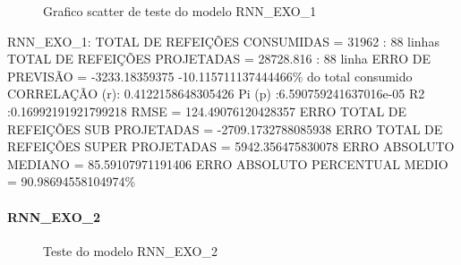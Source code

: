 \documentclass[	12pt, Times, openright, twoside, a4paper, english, brazil]{abntex2}
\begin{document}
                \begin{figure}[!ht]
                  \caption{Grafico scatter de teste do modelo RNN\_EXO\_1 \label{fig:case1_rnn_exo_1_test_scatter} }
                \end{figure}
                RNN\_EXO\_1:
                TOTAL DE REFEIÇÕES CONSUMIDAS = 31962 : 88 linhas \newline
                TOTAL DE REFEIÇÕES PROJETADAS = 28728.816 : 88 linha \newline
                ERRO DE PREVISÃO = -3233.18359375 -10.115711137444466\% do total consumido\newline
                CORRELAÇÃO (r): 0.4122158648305426 Pi (p) :6.590759241637016e-05 R2 :0.16992191921799218\newline
                RMSE = 124.49076120428357\newline
                ERRO TOTAL DE REFEIÇÕES SUB PROJETADAS = -2709.1732788085938\newline
                ERRO TOTAL DE REFEIÇÕES SUPER PROJETADAS = 5942.356475830078\newline
                ERRO ABSOLUTO MEDIANO = 85.59107971191406\newline
                ERRO ABSOLUTO PERCENTUAL MEDIO = 90.98694558104974\%\newline
              \paragraph{RNN\_EXO\_2}
                \begin{figure}[!ht]
                  \caption{Teste do modelo RNN\_EXO\_2 \label{fig:case1_rnn_exo_2_test} }
                \end{figure}
\end{document}
